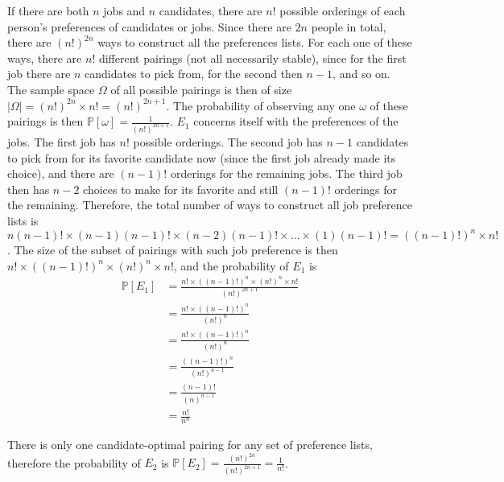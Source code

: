 \documentclass[11pt]{article}
\begin{document}
\begin{solution}
\begin{Parts}
\Part If there are both $n$ jobs and $n$ candidates, there are $n!$ possible orderings
of each person's preferences of candidates or jobs. Since there are $2n$ people in total,
there are $(n!)^{2n}$ ways to construct all the preferences lists. For each one of these
ways, there are $n!$ different pairings (not all necessarily stable), since for the first
job there are $n$ candidates to pick from, for the second then $n-1$, and so on. The sample
space $\Omega$ of all possible pairings is then of size $|\Omega|= (n!)^{2n}\times n! = 
(n!)^{2n+1}$. The probability of observing any one $\omega$ of these pairings is then 
$\mathbb{P}[\omega]=\frac{1}{(n!)^{2n+1}}$. $E_1$ concerns itself with the preferences of
the jobs. The first job has $n!$ possible orderings. The second job has $n-1$ candidates
to pick from for its favorite candidate now (since the first job already made its choice),
and there are $(n-1)!$ orderings for the remaining jobs. The third job then has $n-2$ choices
to make for its favorite and still $(n-1)!$ orderings for the remaining. Therefore, the total
number of ways to construct all job preference lists is $n(n-1)! \times (n-1)(n-1)! \times 
(n-2)(n-1)!\times \dots \times (1)(n-1)! = ((n-1)!)^n\times n!$. The size of the subset of 
pairings with such job preference is then $n!\times((n-1)!)^n \times (n!)^n \times n!$, and the
probability of $E_1$ is 
\[
    \begin{split}
        \mathbb{P}[E_1] &= \frac{n!\times((n-1)!)^n \times (n!)^n \times n!}{(n!)^{2n+1}} \\
        &= \frac{n!\times((n-1)!)^n}{(n!)^n} \\
        &= \frac{n!\times((n-1)!)^n}{(n!)^n} \\
        &= \frac{((n-1)!)^n}{(n!)^{n-1}} \\
        &= \frac{(n-1)!}{(n)^{n-1}} \\
        &= \frac{n!}{n^{n}}
    \end{split}
\]

There is only one candidate-optimal pairing for any set of preference lists, therefore the
probability of $E_2$ is $\mathbb{P}[E_2]=\frac{(n!)^{2n}}{(n!)^{2n+1}} = \frac{1}{n!}$.


\end{Parts}

\end{solution}
\end{document}
